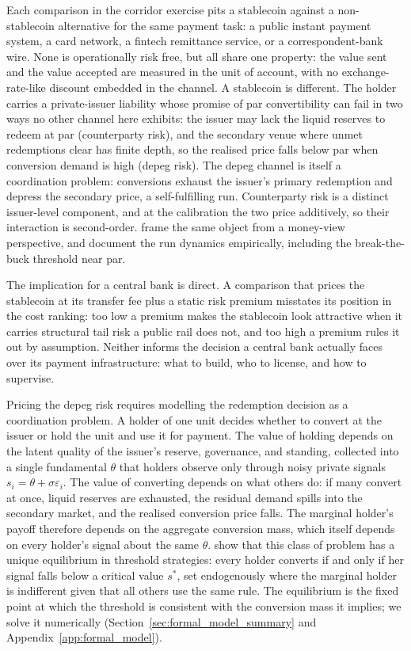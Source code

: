 Each comparison in the corridor exercise pits a stablecoin against a non-stablecoin alternative for the same payment task: a public instant payment system, a card network, a fintech remittance service, or a correspondent-bank wire. None is operationally risk free, but all share one property: the value sent and the value accepted are measured in the unit of account, with no exchange-rate-like discount embedded in the channel. A stablecoin is different. The holder carries a private-issuer liability whose promise of par convertibility can fail in two ways no other channel here exhibits: the issuer may lack the liquid reserves to redeem at par (counterparty risk), and the secondary venue where unmet redemptions clear has finite depth, so the realised price falls below par when conversion demand is high (depeg risk). The depeg channel is itself a coordination problem: conversions exhaust the issuer's primary redemption and depress the secondary price, a self-fulfilling run. Counterparty risk is a distinct issuer-level component, and at the calibration the two price additively, so their interaction is second-order. \citet{aldasoro_mehrling_neilson_2023} frame the same object from a money-view perspective, and \citet{anadu_etal_2023_runs} document the run dynamics empirically, including the break-the-buck threshold near par.

The implication for a central bank is direct. A comparison that prices the stablecoin at its transfer fee plus a static risk premium misstates its position in the cost ranking: too low a premium makes the stablecoin look attractive when it carries structural tail risk a public rail does not, and too high a premium rules it out by assumption. Neither informs the decision a central bank actually faces over its payment infrastructure: what to build, who to license, and how to supervise.

Pricing the depeg risk requires modelling the redemption decision as a coordination problem. A holder of one unit decides whether to convert at the issuer or hold the unit and use it for payment. The value of holding depends on the latent quality of the issuer's reserve, governance, and standing, collected into a single fundamental $\theta$ that holders observe only through noisy private signals $s_i = \theta + \sigma \varepsilon_i$. The value of converting depends on what others do: if many convert at once, liquid reserves are exhausted, the residual demand spills into the secondary market, and the realised conversion price falls. The marginal holder's payoff therefore depends on the aggregate conversion mass, which itself depends on every holder's signal about the same $\theta$. \citet{morris_shin_1998} show that this class of problem has a unique equilibrium in threshold strategies: every holder converts if and only if her signal falls below a critical value $s^*$, set endogenously where the marginal holder is indifferent given that all others use the same rule. The equilibrium is the fixed point at which the threshold is consistent with the conversion mass it implies; we solve it numerically (Section~\ref{sec:formal_model_summary} and Appendix~\ref{app:formal_model}).

